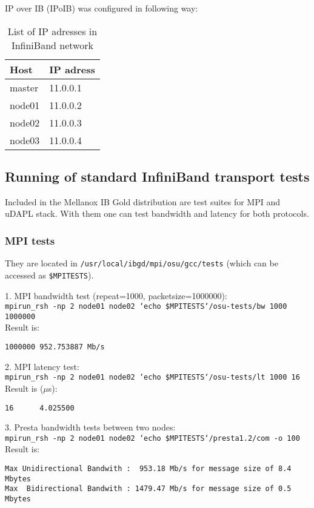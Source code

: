 IP over IB (IPoIB) was configured in following way:

\begin{table}[htb]
\begin{center}

\caption{List of IP adresses in InfiniBand network}

\begin{tabular}{|l|l|}\hline
 Host     & IP adress  \\ \hline
 master   & 11.0.0.1   \\ \hline
 node01   & 11.0.0.2   \\ \hline
 node02   & 11.0.0.3   \\ \hline
 node03   & 11.0.0.4   \\ \hline
\end{tabular}
\end{center}
\end{table}


\subsection{Running of standard InfiniBand transport tests}

Included in the Mellanox IB Gold distribution are test suites for MPI and uDAPL stack.
With them one can test bandwidth and latency for both protocols.

\subsubsection{MPI tests}
They are located in {\tt /usr/local/ibgd/mpi/osu/gcc/tests} (which can be accessed as {\tt \$MPITESTS}).

1. MPI bandwidth test (repeat=1000, packetsize=1000000):\\
{\tt mpirun\_rsh -np 2 node01 node02 `echo \$MPITESTS`/osu-tests/bw 1000 1000000}\\
Result is:
\begin{verbatim}
1000000 952.753887 Mb/s
\end{verbatim}

2. MPI latency test:\\
{\tt mpirun\_rsh -np 2 node01 node02 `echo \$MPITESTS`/osu-tests/lt 1000 16}\\
Result is ($\mu$s):
\begin{verbatim}
16      4.025500
\end{verbatim}

3. Presta bandwidth tests between two nodes:\\
{\tt mpirun\_rsh -np 2 node01 node02 `echo \$MPITESTS`/presta1.2/com -o 100}\\
Result is:
\begin{verbatim}
Max Unidirectional Bandwith :  953.18 Mb/s for message size of 8.4 Mbytes
Max  Bidirectional Bandwith : 1479.47 Mb/s for message size of 0.5 Mbytes
\end{verbatim}

